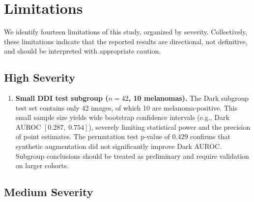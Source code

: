 \section{Limitations}

We identify fourteen limitations of this study, organized by severity. Collectively, these limitations indicate that the reported results are directional, not definitive, and should be interpreted with appropriate caution.

\subsection{High Severity}

\begin{enumerate}
    \item \textbf{Small DDI test subgroup ($n=42$, 10 melanomas).} The Dark subgroup test set contains only 42 images, of which 10 are melanoma-positive. This small sample size yields wide bootstrap confidence intervals (e.g., Dark AUROC $[0.287,\; 0.754]$), severely limiting statistical power and the precision of point estimates. The permutation test p-value of 0.429 confirms that synthetic augmentation did not significantly improve Dark AUROC. Subgroup conclusions should be treated as preliminary and require validation on larger cohorts.
\end{enumerate}

\subsection{Medium Severity}

